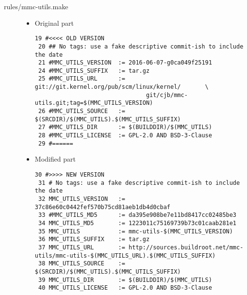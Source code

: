 \begin{description}
    \item[rules/mmc-utils.make]
        \begin{itemize}
            \item Original part
                \begin{lstlisting}[caption={rules/mmc-utils}]
 19 #<<<< OLD VERSION
 20 ## No tags: use a fake descriptive commit-ish to include the date
 21 #MMC_UTILS_VERSION  := 2016-06-07-g0ca049f25191
 24 #MMC_UTILS_SUFFIX   := tar.gz
 25 #MMC_UTILS_URL      := git://git.kernel.org/pub/scm/linux/kernel/   	\
								git/cjb/mmc-utils.git;tag=$(MMC_UTILS_VERSION)
 26 #MMC_UTILS_SOURCE   := $(SRCDIR)/$(MMC_UTILS).$(MMC_UTILS_SUFFIX)
 27 #MMC_UTILS_DIR      := $(BUILDDIR)/$(MMC_UTILS)
 28 #MMC_UTILS_LICENSE  := GPL-2.0 AND BSD-3-Clause
 29 #======
                \end{lstlisting}
            \item Modified part

                \begin{lstlisting}[caption={rules/mmc-utils}]
30 #>>>> NEW VERSION
 31 # No tags: use a fake descriptive commit-ish to include the date
 32 MMC_UTILS_VERSION   := 37c86e60c0442fef570b75cd81aeb1db4d0cbaf
 33 #MMC_UTILS_MD5      := da395e908be7e11bd8417cc02485be3
 34 MMC_UTILS_MD5       := 1223011c75169739b73c01caab281e1
 35 MMC_UTILS           := mmc-utils-$(MMC_UTILS_VERSION)
 36 MMC_UTILS_SUFFIX    := tar.gz
 37 MMC_UTILS_URL       := http://sources.buildroot.net/mmc-utils/mmc-utils-$(MMC_UTILS_URL).$(MMC_UTILS_SUFFIX)
 38 MMC_UTILS_SOURCE    := $(SRCDIR)/$(MMC_UTILS).$(MMC_UTILS_SUFFIX)
 39 MMC_UTILS_DIR       := $(BUILDDIR)/$(MMC_UTILS)
 40 MMC_UTILS_LICENSE   := GPL-2.0 AND BSD-3-Clause
                \end{lstlisting}

        \end{itemize}
\end{description}

